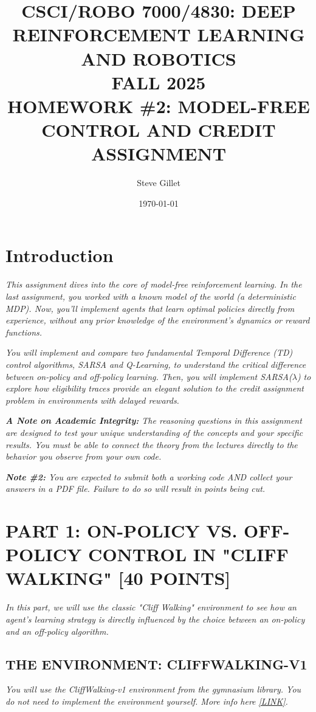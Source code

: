 \documentclass{article}
\title{CSCI/ROBO 7000/4830: DEEP REINFORCEMENT LEARNING AND ROBOTICS \\ FALL 2025 \\ HOMEWORK \#2: MODEL-FREE CONTROL AND CREDIT ASSIGNMENT}
\author{Steve Gillet}
\date{\today}
\begin{document}
\maketitle

\section*{Introduction}

\textit{This assignment dives into the core of model-free reinforcement learning. In the last assignment, you worked with a known model of the world (a deterministic MDP). Now, you'll implement agents that learn optimal policies directly from experience, without any prior knowledge of the environment's dynamics or reward functions.}

\textit{You will implement and compare two fundamental Temporal Difference (TD) control algorithms, SARSA and Q-Learning, to understand the critical difference between on-policy and off-policy learning. Then, you will implement SARSA($\lambda$) to explore how eligibility traces provide an elegant solution to the credit assignment problem in environments with delayed rewards.}

\textit{\textbf{A Note on Academic Integrity:} The reasoning questions in this assignment are designed to test your unique understanding of the concepts and your specific results. You must be able to connect the theory from the lectures directly to the behavior you observe from your own code.}

\textit{\textbf{Note \#2:} You are expected to submit both a working code AND collect your answers in a PDF file. Failure to do so will result in points being cut.}

\section{PART 1: ON-POLICY VS. OFF-POLICY CONTROL IN "CLIFF WALKING" [40 POINTS]}

\textit{In this part, we will use the classic "Cliff Walking" environment to see how an agent's learning strategy is directly influenced by the choice between an on-policy and an off-policy algorithm.}

\subsection{THE ENVIRONMENT: CLIFFWALKING-V1}

\textit{You will use the CliffWalking-v1 environment from the gymnasium library. You do not need to implement the environment yourself. More info here \href{https://gymnasium.farama.org/environments/toy_text/cliff_walking/}{[LINK]}.}
\end{document}
